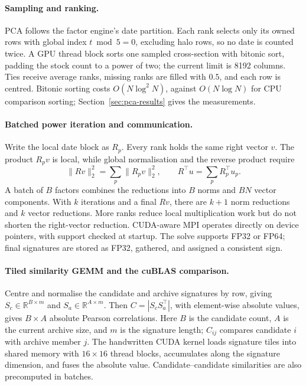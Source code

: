 \documentclass[11pt,a4paper]{article}
\begin{document}
\paragraph{Sampling and ranking.}
PCA follows the factor engine's date partition. Each rank selects only its owned rows with global index $t\bmod5=0$, excluding halo rows, so no date is counted twice. A GPU thread block sorts one sampled cross-section with bitonic sort, padding the stock count to a power of two; the current limit is 8192 columns. Ties receive average ranks, missing ranks are filled with $0.5$, and each row is centred. Bitonic sorting costs $O(N\log^2N)$, against $O(N\log N)$ for CPU comparison sorting; Section~\ref{sec:pca-results} gives the measurements.

\paragraph{Batched power iteration and communication.}
Write the local date block as $R_p$. Every rank holds the same right vector $v$. The product $R_pv$ is local, while global normalisation and the reverse product require
\begin{equation}
  \|Rv\|_2^2=\sum_p\|R_pv\|_2^2,
  \qquad R^\top u=\sum_p R_p^\top u_p .
  \label{eq:pca-reduce}
\end{equation}
A batch of $B$ factors combines the reductions into $B$ norms and $BN$ vector components. With $k$ iterations and a final $Rv$, there are $k+1$ norm reductions and $k$ vector reductions. More ranks reduce local multiplication work but do not shorten the right-vector reduction. CUDA-aware MPI operates directly on device pointers, with support checked at startup. The solve supports FP32 or FP64; final signatures are stored as FP32, gathered, and assigned a consistent sign.

\paragraph{Tiled similarity GEMM and the cuBLAS comparison.}
Centre and normalise the candidate and archive signatures by row, giving $S_c\in\mathbb{R}^{B\times m}$ and $S_a\in\mathbb{R}^{A\times m}$. Then $C=|S_cS_a^\top|$, with element-wise absolute values, gives $B\times A$ absolute Pearson correlations. Here $B$ is the candidate count, $A$ is the current archive size, and $m$ is the signature length; $C_{ij}$ compares candidate $i$ with archive member $j$. The handwritten CUDA kernel loads signature tiles into shared memory with $16\times16$ thread blocks, accumulates along the signature dimension, and fuses the absolute value. Candidate--candidate similarities are also precomputed in batches.
\end{document}
